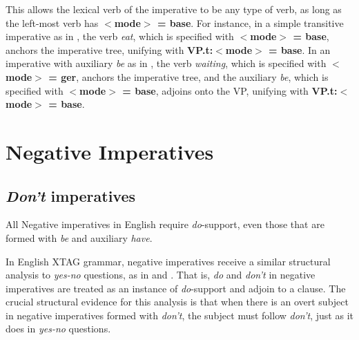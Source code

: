 
This allows the lexical verb of the imperative to be any type of verb, as
long as the left-most verb has {\bf $<$mode$>$ = base}.  For instance, in a
simple transitive imperative as in , the verb {\it eat}, which is
specified with {\bf $<$mode$>$ = base}, anchors the imperative tree,
unifying with {\bf VP.t:$<$mode$>$ = base}.  In an imperative with
auxiliary {\it be} as in , the verb {\it waiting}, which is specified
with {\bf $<$mode$>$ = ger}, anchors the imperative tree, and the auxiliary
{\it be}, which is specified with {\bf $<$mode$>$ = base}, adjoins onto the
VP, unifying with {\bf VP.t:$<$mode$>$ = base}.



\section{Negative Imperatives}
\label{neg-imp}

\subsection{{\it Don't} imperatives}

All Negative imperatives in English require {\it do}-support, even those
that are formed with {\it be} and auxiliary {\it have}.





In English XTAG grammar, negative imperatives receive a similar structural analysis
to {\it yes-no} questions, as in \cite{potsdamdiss97} and \cite{handiss}.
That is, {\it do} and {\it don't} in negative imperatives are treated as an
instance of {\it do}-support and adjoin to a clause.  The crucial
structural evidence for this analysis is that when there is an overt subject
in negative imperatives formed with {\it don't}, the subject must follow
{\it don't}, just as it does in {\it yes-no} questions.


